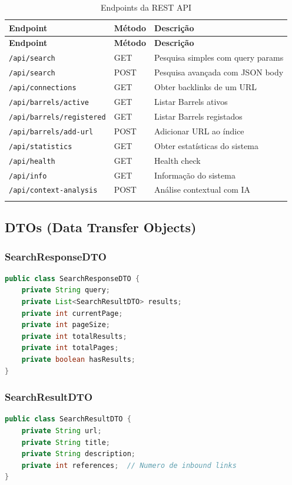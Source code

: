 \documentclass[12pt,a4paper]{article}
\begin{document}
\begin{longtable}{|p{3cm}|p{3.5cm}|p{7cm}|}
\hline
\textbf{Endpoint} & \textbf{Método} & \textbf{Descrição} \\
\hline
\endfirsthead
\hline
\textbf{Endpoint} & \textbf{Método} & \textbf{Descrição} \\
\hline
\endhead
\hline
\endfoot

\texttt{/api/search} & GET & Pesquisa simples com query params \\
\texttt{/api/search} & POST & Pesquisa avançada com JSON body \\
\texttt{/api/connections} & GET & Obter backlinks de um URL \\
\texttt{/api/barrels/active} & GET & Listar Barrels ativos \\
\texttt{/api/barrels/registered} & GET & Listar Barrels registados \\
\texttt{/api/barrels/add-url} & POST & Adicionar URL ao índice \\
\texttt{/api/statistics} & GET & Obter estatísticas do sistema \\
\texttt{/api/health} & GET & Health check \\
\texttt{/api/info} & GET & Informação do sistema \\
\texttt{/api/context-analysis} & POST & Análise contextual com IA \\
\hline
\caption{Endpoints da REST API}
\label{tab:endpoints}
\end{longtable}

\subsection{DTOs (Data Transfer Objects)}

\subsubsection{SearchResponseDTO}
\begin{lstlisting}[language=Java, caption={Estrutura de resposta de pesquisa}]
public class SearchResponseDTO {
    private String query;
    private List<SearchResultDTO> results;
    private int currentPage;
    private int pageSize;
    private int totalResults;
    private int totalPages;
    private boolean hasResults;
}
\end{lstlisting}

\subsubsection{SearchResultDTO}
\begin{lstlisting}[language=Java, caption={Estrutura de resultado individual}]
public class SearchResultDTO {
    private String url;
    private String title;
    private String description;
    private int references;  // Numero de inbound links
}
\end{lstlisting}
\end{document}
